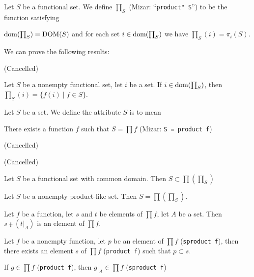 \documentclass{article}
\begin{document}
\begin{definition}
Let $S$ be a functional set.
We define ${\prod}_{S}$ (Mizar: ``\verb#product" S#'') to be the function
satisfying
\begin{defn}
\item $\operatorname{dom}({\prod}_{S})=\operatorname{DOM}(S)$ and for each set $i\in\operatorname{dom}({\prod}_{S})$
  we have ${\prod}_{S}(i)=\pi_{i}(S)$.
\end{defn}
\end{definition}

We can prove the following results:
\begin{thm}
\item\label{card3:73} (Cancelled)
\item\label{card3:74} Let $S$ be a nonempty functional set, let $i$ be a set.
  If $i\in\operatorname{dom}({\prod}_{S})$,
  then ${\prod}_{S}(i)=\{f(i)\mid f\in S\}$.
\end{thm}

\begin{definition}
Let $S$ be a set.
We define the attribute $S$ is  to mean
\begin{defn}
\item There exists a function $f$ such that $S=\prod f$ (Mizar:
  \verb#S = product f#)
\end{defn}
\end{definition}

\begin{thm}
\item\label{card3:75} (Cancelled)
\item\label{card3:76} (Cancelled)
\item\label{card3:77} Let $S$ be a functional set with common domain.
  Then $S\subset\prod({\prod}_{S})$
\item\label{card3:78} Let $S$ be a nonempty product-like set. Then
  $S=\prod({\prod}_{S})$.
\item\label{card3:79} Let $f$ be a function, let $s$ and $t$ be elements
  of $\prod f$, let $A$ be a set.
  Then $s\plusdot (t|_{A})$ is an element of $\prod f$.
\item\label{card3:80} Let $f$ be a nonempty function, let $p$ be an
  element of $\prod f$ (\verb#sproduct f#),
  then there exists an element $s$ of $\prod f$ (\verb#product f#)
  such that $p\subset s$.
\item\label{card3:81} If $g\in\prod f$ (\verb#product f#),
  then $g|_{A}\in\prod f$ (\verb#sproduct f#)
\end{thm}
\end{document}
